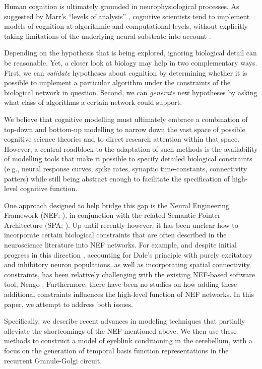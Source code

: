 
Human cognition is ultimately grounded in neurophysiological processes.
As suggested by Marr's \enquote{levels of analysis} \citep{marr1976understanding}, cognitive scientists tend to implement models of cognition at algorithmic and computational levels, without explicitly taking limitations of the underlying neural substrate into account \citep{eliasmith2015marr}.

Depending on the hypothesis that is being explored, ignoring biological detail can be reasonable. Yet, a closer look at biology may help in two complementary ways.
First, we can \emph{validate} hypotheses about cognition by determining whether it is possible to implement a particular algorithm under the constraints of the biological network in question.  
Second, we can \emph{generate} new hypotheses by asking what class of algorithms a certain network could support.

We believe that cognitive modelling must ultimately embrace a combination of top-down and bottom-up modelling to narrow down the vast space of possible cognitive science theories and to direct research attention within that space.
However, a central roadblock to the adaptation of such methods is the availability of modelling tools that make it possible to specify detailed biological constraints (e.g., neural response curves, spike rates, synaptic time-constants, connectivity patters) while still being abstract enough to facilitate the specification of high-level cognitive function.

One approach designed to help bridge this gap is the Neural Engineering Framework (NEF; \cite{eliasmith2003neural}), in conjunction with the related Semantic Pointer Architecture (SPA; \cite{eliasmith2013how}).
Up until recently however, it has been unclear how to incorporate certain biological constraints that are often described in the neuroscience literature into NEF networks.
For example, and despite initial progress in this direction \cite{parisien2008solving}, accounting for Dale's principle with purely excitatory and inhibitory neuron populations, as well as incorporating spatial connectivity constraints, has been relatively challenging with the existing NEF-based software tool, Nengo \cite{bekolay2014nengo}.
Furthermore, there have been no studies on how adding these additional constraints influences the high-level function of NEF networks. In this paper, we attempt to address both issues.

Specifically, we describe recent advances in modeling techniques that partially alleviate the shortcomings of the NEF mentioned above.
We then use these methods to construct a model of eyeblink conditioning in the cerebellum, with a focus on the generation of temporal basis function representations in the recurrent Granule-Golgi circuit.

